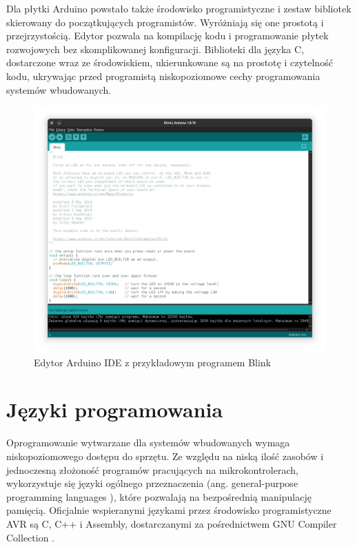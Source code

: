 Dla płytki Arduino powstało także środowisko programistyczne i zestaw bibliotek skierowany do początkujących programistów. Wyróżniają się one prostotą i przejrzystością. Edytor pozwala na kompilację kodu i programowanie płytek rozwojowych bez skomplikowanej konfiguracji. Biblioteki dla języka C, dostarczone wraz ze środowiskiem, ukierunkowane są na prostotę i czytelność kodu, ukrywając przed programistą niskopoziomowe cechy programowania systemów wbudowanych.
\begin{figure}%
\centering
	\includegraphics[width=1\textwidth]{graf/arduino-ide-blink.png}
	\caption{Edytor Arduino IDE z przykładowym programem Blink}
\label{fig:edytor}
\end{figure}

\section{Języki programowania}
Oprogramowanie wytwarzane dla systemów wbudowanych wymaga niskopoziomowego dostępu do sprzętu. Ze względu na niską ilość zasobów i jednoczesną złożoność programów pracujących na mikrokontrolerach, wykorzystuje się języki ogólnego przeznaczenia (ang. general-purpose programming languages ), które pozwalają na bezpośrednią manipulację pamięcią. Oficjalnie wspieranymi językami przez środowisko programistyczne AVR są C, C++ i Assembly, dostarczanymi za pośrednictwem GNU Compiler Collection .

